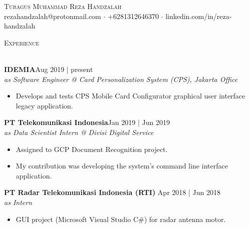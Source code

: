\documentclass[a4paper]{article}
\newcommand{\lineunder} {
    \vspace*{-8pt} \\
    \hspace*{-18pt} \hrulefill \\
}
\newcommand{\header} [1] {
    {\hspace*{-18pt}\vspace*{6pt} \textsc{#1}}
    \vspace*{-6pt} \lineunder
}
\begin{document}
\vspace*{-40pt}

    

\vspace*{-10pt}
\begin{center}
	{\Large \scshape {Tubagus Muhammad Reza Handzalah}}\\
	rezahandzalah@protonmail.com $\cdot$ +6281312646370 $\cdot$ linkedin.com/in/reza-handzalah\\
\end{center}

\header{Experience}
\vspace{1mm}

\textbf{IDEMIA}\hfill Aug 2019 | present\\
\textit{as Software Engineer @ Card Personalization System (CPS), Jakarta Office}\\
\vspace{-1mm}
\begin{itemize} \itemsep 1pt
	\item Develops and tests CPS Mobile Card Configurator graphical user interface legacy application.
\end{itemize}
\vspace{1mm}

\textbf{PT Telekomunikasi Indonesia}\hfill Jan 2019 | Jun 2019\\
\textit{as Data Scientist Intern @ Divisi Digital Service}\\
\vspace{-1mm}
\begin{itemize} \itemsep 1pt
	\item Assigned to GCP Document Recognition project. 
    \item My contribution was developing the system's command line interface application.
\end{itemize}
\vspace{1mm}



\textbf{PT Radar Telekomunikasi Indonesia (RTI)} \hfill Apr 2018 | Jun 2018\\
\textit{as Intern}\\
\vspace{-1mm}
\begin{itemize} \itemsep 1pt
	\item GUI project (Microsoft Visual Studio C\#) for radar antenna motor.
  
\end{itemize}
\end{document}

